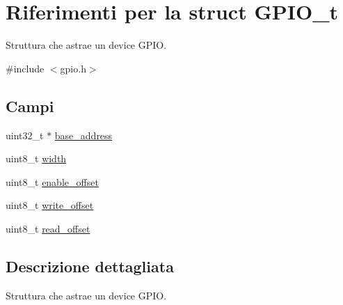 \hypertarget{struct_g_p_i_o__t}{\section{Riferimenti per la struct G\+P\+I\+O\+\_\+t}
\label{struct_g_p_i_o__t}
}


Struttura che astrae un device G\+P\+I\+O.  




{\ttfamily \#include $<$gpio.\+h$>$}

\subsection*{Campi}
\begin{DoxyCompactItemize}
\item 
uint32\+\_\+t $\ast$ \hyperlink{struct_g_p_i_o__t_a79c591d5fa42efdf86abd98347fece90}{base\+\_\+address}
\item 
uint8\+\_\+t \hyperlink{struct_g_p_i_o__t_a09a2a45f731b02946ff6d3cd15c1a476}{width}
\item 
uint8\+\_\+t \hyperlink{struct_g_p_i_o__t_a14886d03a6936e5edd25a9ad27af16bd}{enable\+\_\+offset}
\item 
uint8\+\_\+t \hyperlink{struct_g_p_i_o__t_abb65e5db6d4ad365a7c48d00e4af1f78}{write\+\_\+offset}
\item 
uint8\+\_\+t \hyperlink{struct_g_p_i_o__t_ab65acde67dc46f1d163e2ee468420b48}{read\+\_\+offset}
\end{DoxyCompactItemize}


\subsection{Descrizione dettagliata}
Struttura che astrae un device G\+P\+I\+O. 

